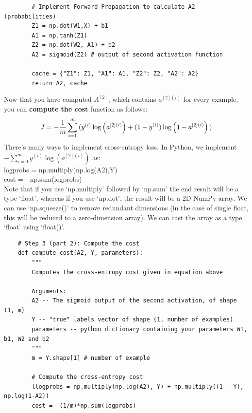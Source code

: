 \documentclass[11pt, a4paper]{article}
\begin{document}
\begin{spacing}{1.1}
\begin{lstlisting}
		# Implement Forward Propagation to calculate A2 (probabilities)
		Z1 = np.dot(W1,X) + b1
		A1 = np.tanh(Z1)
		Z2 = np.dot(W2, A1) + b2
		A2 = sigmoid(Z2) # output of second activation function
		
		cache = {"Z1": Z1, "A1": A1, "Z2": Z2, "A2": A2}
		return A2, cache \end{lstlisting} \newpage

	\noindent Now that you have computed $A^{[2]}$, which contains $a^{[2](i)}$ for every example, you can \textbf{compute the cost} function as follows:
	$$J = - \frac{1}{m} \sum\limits_{i = 1}^{m} \large{(} \small y^{(i)}\log\left(a^{[2] (i)}\right) + (1-y^{(i)})\log\left(1- a^{[2] (i)}\right) \large{)} \small$$
	There's many ways to implement cross-entropy loss. In Python, we implement $- \sum\limits_{i=0}^{m}  y^{(i)}\log(a^{[2](i)})$ as: \\
	logprobs = np.multiply(np.log(A2),Y) \\
	cost = - np.sum(logprobs) \vspace*{2mm} \\
	Note that if you use `np.multiply' followed by `np.sum' the end result will be a type `float', whereas if you use `np.dot', the result will be a 2D NumPy array.  We can use `np.squeeze()' to remove redundant dimensions (in the case of single float, this will be reduced to a zero-dimension array). We can cast the array as a type `float' using `float()'.
	\begin{lstlisting}
	# Step 3 (part 2): Compute the cost
	def compute_cost(A2, Y, parameters):
		"""
		Computes the cross-entropy cost given in equation above
		
		Arguments:
		A2 -- The sigmoid output of the second activation, of shape (1, m)
		Y -- "true" labels vector of shape (1, number of examples)
		parameters -- python dictionary containing your parameters W1, b1, W2 and b2
		"""
		m = Y.shape[1] # number of example
		
		# Compute the cross-entropy cost
		llogprobs = np.multiply(np.log(A2), Y) + np.multiply((1 - Y), np.log(1-A2))
		cost = -(1/m)*np.sum(logprobs)


\end{lstlisting}
\end{spacing}
\end{document}
